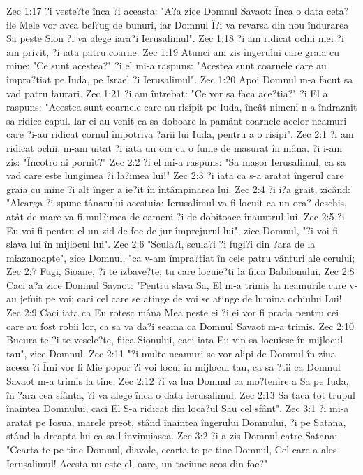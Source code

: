 Zec 1:17  ?i veste?te înca ?i aceasta: "A?a zice Domnul Savaot: Înca o data ceta?ile Mele vor avea bel?ug de bunuri, iar Domnul Î?i va revarsa din nou îndurarea Sa peste Sion ?i va alege iara?i Ierusalimul".
Zec 1:18  ?i am ridicat ochii mei ?i am privit, ?i iata patru coarne.
Zec 1:19  Atunci am zis îngerului care graia cu mine: "Ce sunt acestea?" ?i el mi-a raspuns: "Acestea sunt coarnele care au împra?tiat pe Iuda, pe Israel ?i Ierusalimul".
Zec 1:20  Apoi Domnul m-a facut sa vad patru faurari.
Zec 1:21  ?i am întrebat: "Ce vor sa faca ace?tia?" ?i El a raspuns: "Acestea sunt coarnele care au risipit pe Iuda, încât nimeni n-a îndraznit sa ridice capul. Iar ei au venit ca sa doboare la pamânt coarnele acelor neamuri care ?i-au ridicat cornul împotriva ?arii lui Iuda, pentru a o risipi".
Zec 2:1  ?i am ridicat ochii, m-am uitat ?i iata un om cu o funie de masurat în mâna. ?i i-am zis: "Încotro ai pornit?"
Zec 2:2  ?i el mi-a raspuns: "Sa masor Ierusalimul, ca sa vad care este lungimea ?i la?imea lui!"
Zec 2:3  ?i iata ca s-a aratat îngerul care graia cu mine ?i alt înger a ie?it în întâmpinarea lui.
Zec 2:4  ?i i?a grait, zicând: "Alearga ?i spune tânarului acestuia: Ierusalimul va fi locuit ca un ora? deschis, atât de mare va fi mul?imea de oameni ?i de dobitoace înauntrul lui.
Zec 2:5  ?i Eu voi fi pentru el un zid de foc de jur împrejurul lui", zice Domnul, "?i voi fi slava lui în mijlocul lui".
Zec 2:6  "Scula?i, scula?i ?i fugi?i din ?ara de la miazanoapte", zice Domnul, "ca v-am împra?tiat în cele patru vânturi ale cerului;
Zec 2:7  Fugi, Sioane, ?i te izbave?te, tu care locuie?ti la fiica Babilonului.
Zec 2:8  Caci a?a zice Domnul Savaot: "Pentru slava Sa, El m-a trimis la neamurile care v-au jefuit pe voi; caci cel care se atinge de voi se atinge de lumina ochiului Lui!
Zec 2:9  Caci iata ca Eu rotesc mâna Mea peste ei ?i ei vor fi prada pentru cei care au fost robii lor, ca sa va da?i seama ca Domnul Savaot m-a trimis.
Zec 2:10  Bucura-te ?i te vesele?te, fiica Sionului, caci iata Eu vin sa locuiesc în mijlocul tau", zice Domnul.
Zec 2:11  "?i multe neamuri se vor alipi de Domnul în ziua aceea ?i Îmi vor fi Mie popor ?i voi locui în mijlocul tau, ca sa ?tii ca Domnul Savaot m-a trimis la tine.
Zec 2:12  ?i va lua Domnul ca mo?tenire a Sa pe Iuda, în ?ara cea sfânta, ?i va alege înca o data Ierusalimul.
Zec 2:13  Sa taca tot trupul înaintea Domnului, caci El S-a ridicat din loca?ul Sau cel sfânt".
Zec 3:1  ?i mi-a aratat pe Iosua, marele preot, stând înaintea îngerului Domnului, ?i pe Satana, stând la dreapta lui ca sa-l învinuiasca.
Zec 3:2  ?i a zis Domnul catre Satana: "Cearta-te pe tine Domnul, diavole, cearta-te pe tine Domnul, Cel care a ales Ierusalimul! Acesta nu este el, oare, un taciune scos din foc?"
